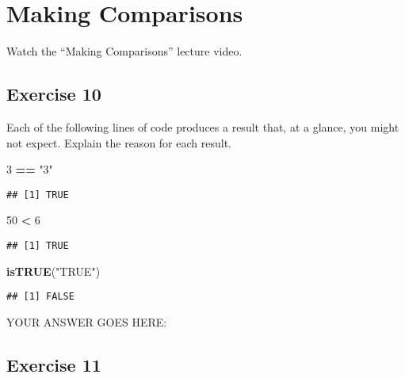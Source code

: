 \documentclass[
]{article}
\newenvironment{Shaded}{\begin{snugshade}}{\end{snugshade}}
\newcommand{\DecValTok}[1]{\textcolor[rgb]{0.00,0.00,0.81}{#1}}
\newcommand{\KeywordTok}[1]{\textcolor[rgb]{0.13,0.29,0.53}{\textbf{#1}}}
\newcommand{\NormalTok}[1]{#1}
\newcommand{\OperatorTok}[1]{\textcolor[rgb]{0.81,0.36,0.00}{\textbf{#1}}}
\newcommand{\StringTok}[1]{\textcolor[rgb]{0.31,0.60,0.02}{#1}}
\begin{document}
\hypertarget{making-comparisons}{%
\section{Making Comparisons}\label{making-comparisons}}

Watch the ``Making Comparisons'' lecture video.

\hypertarget{exercise-10}{%
\subsection{Exercise 10}\label{exercise-10}}

Each of the following lines of code produces a result that, at a glance,
you might not expect. Explain the reason for each result.

\begin{Shaded}
\begin{Highlighting}[]
\DecValTok{3} \OperatorTok{==}\StringTok{ "3"}
\end{Highlighting}
\end{Shaded}

\begin{verbatim}
## [1] TRUE
\end{verbatim}

\begin{Shaded}
\begin{Highlighting}[]
\DecValTok{50} \OperatorTok{\textless{}}\StringTok{ \textquotesingle{}6\textquotesingle{}}
\end{Highlighting}
\end{Shaded}

\begin{verbatim}
## [1] TRUE
\end{verbatim}

\begin{Shaded}
\begin{Highlighting}[]
\KeywordTok{isTRUE}\NormalTok{(}\StringTok{"TRUE"}\NormalTok{)}
\end{Highlighting}
\end{Shaded}

\begin{verbatim}
## [1] FALSE
\end{verbatim}

YOUR ANSWER GOES HERE:

\hypertarget{exercise-11}{%
\subsection{Exercise 11}\label{exercise-11}}
\end{document}
